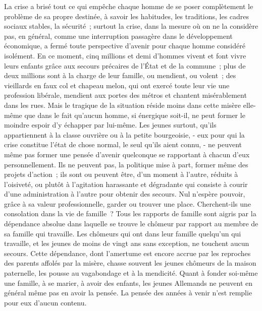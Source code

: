 \documentclass[french,twoside]{book} %
\begin{document}
La crise a brisé tout ce qui empêche chaque homme de se poser complète­ment le problème de sa propre destinée, à savoir les habitudes, les traditions, les cadres sociaux stables, la sécurité ; surtout la crise, dans la mesure où on ne la considère pas, en général, comme une interruption passagère dans le développement économique, a fermé toute perspective d'avenir pour chaque homme considéré isolément. En ce moment, cinq millions et demi d'hommes vivent et font vivre leurs enfants grâce aux secours précaires de l'État et de la commune ; plus de deux millions sont à la charge de leur famille, ou mendient, ou volent ; des vieillards en faux col et chapeau melon, qui ont exercé toute leur vie une profession libérale, mendient aux portes des métros et chantent misérablement dans les rues. Mais le tragique de la situation réside moins dans cette misère elle-même que dans le fait qu'aucun homme, si énergique soit-il, ne peut former le moindre espoir d'y échapper par lui-même. Les jeunes surtout, qu'ils appartiennent à la classe ouvrière ou à la petite bourgeoisie, - eux pour qui la crise constitue l'état de chose normal, le seul qu'ils aient connu, - ne peuvent même pas former une pensée d'avenir quel­conque se rapportant à chacun d'eux personnellement. Ils ne peuvent pas, la politique mise à part, former même des projets d'action ; ils sont ou peuvent être, d'un moment à l'autre, réduits à l'oisiveté, ou plutôt à l'agitation harassante et dégradante qui consiste à courir d'une administration à l'autre pour obtenir des secours. Nul n'espère pouvoir, grâce à sa valeur profession­nelle, garder ou trouver une place. Cherchent-ils une consolation dans la vie de famille ? Tous les rapports de famille sont aigris par la dépendance absolue dans laquelle se trouve le chômeur par rapport au membre de sa famille qui travaille. Les chômeurs qui ont dans leur famille quelqu'un qui travaille, et les jeunes de moins de vingt ans sans exception, ne touchent aucun secours. Cette dépendance, dont l'amertume est encore accrue par les reproches des parents affolés par la misère, chasse souvent les jeunes chômeurs de la maison paternelle, les pousse au vagabondage et à la mendicité. Quant à fonder soi-même une famille, à se marier, à avoir des enfants, les jeunes Allemands ne peuvent en général même pas en avoir la pensée. La pensée des années à venir n'est remplie pour eux d'aucun contenu.\par
\end{document}
